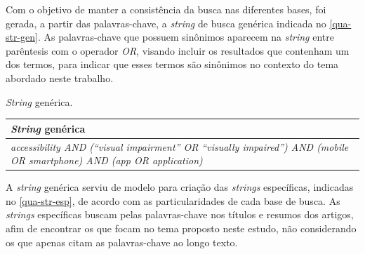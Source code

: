 Com o objetivo de manter a consistência da busca nas diferentes bases, foi gerada, a partir das palavras-chave, a \emph{string} de busca genérica indicada no \autoref{qua-str-gen}.
As palavras-chave que possuem sinônimos aparecem na \emph{string} entre parêntesis com o operador \emph{OR}, visando incluir os resultados que contenham um dos termos, para indicar que esses termos são sinônimos no contexto do tema abordado neste trabalho.

\begin{quadro}[htb]
  \caption{\label{qua-str-gen}\emph{String} genérica.}
  \begin{tabular}{|m{11.5cm}|}
    \hline
    \textbf{\emph{String} genérica}                                                                                           \\
    \hline
    \emph{accessibility AND (“visual impairment” OR “visually impaired”) AND (mobile OR smartphone) AND (app OR application)} \\ \hline
  \end{tabular}
\end{quadro}

A \emph{string} genérica serviu de modelo para criação das \emph{strings} específicas, indicadas no \autoref{qua-str-esp}, de acordo com as particularidades de cada base de busca.
As \emph{strings} específicas buscam pelas palavras-chave nos títulos e resumos dos artigos, afim de encontrar os que focam no tema proposto neste estudo, não considerando os que apenas citam as palavras-chave ao longo texto.

